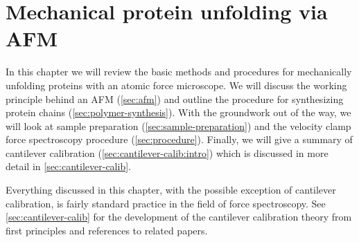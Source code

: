 \chapter{Mechanical protein unfolding via AFM}
\label{sec:methods}

In this chapter we will review the basic methods and procedures for
mechanically unfolding proteins with an atomic force microscope.  We
will discuss the working principle behind an AFM (\cref{sec:afm}) and
outline the procedure for synthesizing protein chains
(\cref{sec:polymer-synthesis}).  With the groundwork out of the way,
we will look at sample preparation (\cref{sec:sample-preparation}) and
the velocity clamp force spectroscopy procedure
(\cref{sec:procedure}).  Finally, we will give a summary of cantilever
calibration (\cref{sec:cantilever-calib:intro}) which is discussed in
more detail in \cref{sec:cantilever-calib}.

Everything discussed in this chapter, with the possible exception of
cantilever calibration, is fairly standard practice in the field of
force spectroscopy.  See \cref{sec:cantilever-calib} for the
development of the cantilever calibration theory from first principles
and references to related papers.






